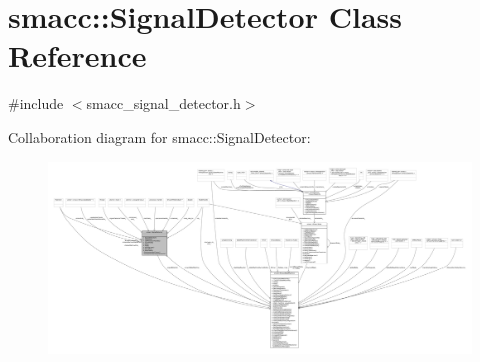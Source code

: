 \hypertarget{classsmacc_1_1SignalDetector}{}\section{smacc\+:\+:Signal\+Detector Class Reference}
\label{classsmacc_1_1SignalDetector}


{\ttfamily \#include $<$smacc\+\_\+signal\+\_\+detector.\+h$>$}



Collaboration diagram for smacc\+:\+:Signal\+Detector\+:
\nopagebreak
\begin{figure}[H]
\begin{center}
\leavevmode
\includegraphics[width=350pt]{classsmacc_1_1SignalDetector__coll__graph}
\end{center}
\end{figure}
